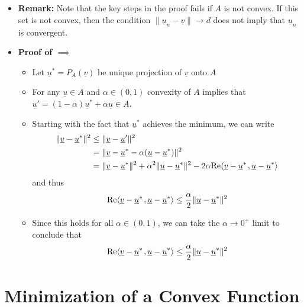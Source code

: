 \documentclass[11pt,twoside]{report}
\newcommand{\vecnot}{\underline}
\newcommand{\Real}{\mathrm{Re}}
\newcommand{\inner}[2]{{\left\langle #1 \mskip2mu , #2 \right\rangle}}
\begin{document}
\begin{itemize}
\begin{itemize}
\end{itemize}


\item \textbf{Remark:} Note that the key steps in the proof fails if $A$ is not convex. If this set is not convex, then  %
 the condition  $\| \vecnot{u}_n - \vecnot{v} \| \to d$ does not imply that $ \vecnot{u}_n$ is convergent. 


\item \textbf{Proof of $\implies$} 
\begin{itemize}
\item Let $\vecnot{u}^* = P_A (\vecnot{v}) $ be unique projection of $\vecnot{v}$ onto $A$
\item For any $\vecnot{u} \in A$ and $\alpha \in (0,1)$ convexity of $A$ implies that $\vecnot{u}' = (1-\alpha) \vecnot{u}^* + \alpha \vecnot{u} \in A$. 
\item Starting with the fact that $\vecnot{u}^*$ achieves the minimum, we can write
\begin{align*}
\| \vecnot{v} - \vecnot{u}^*\|^2 &  \le \| \vecnot{v} - \vecnot{u}'\|^2 \\
&  = \| \vecnot{v} - \vecnot{u}^*   - \alpha ( \vecnot{u} - \vecnot{u}^*) \|^2 \\
&  = \| \vecnot{v} - \vecnot{u}^*\|^2    + \alpha^2 \|\vecnot{u} - \vecnot{u}^*\|^2 -  2 \alpha \Real{\inner{ \vecnot{v} - \vecnot{u}^*}{ \vecnot{u} - \vecnot{u}^*}}
\end{align*}
and thus 
\[
\Real{\inner{ \vecnot{v} - \vecnot{u}^*}{ \vecnot{u} - \vecnot{u}^*}} \le \frac{ \alpha}{2} \|\vecnot{u} - \vecnot{u}^*\|^2
\] 
\item Since this holds for all $\alpha \in (0,1)$, we can take the  $\alpha \to 0^+$ limit to conclude that
\[
\Real{\inner{ \vecnot{v} - \vecnot{u}^*}{ \vecnot{u} - \vecnot{u}^*}} \le \frac{ \alpha}{2} \|\vecnot{u} - \vecnot{u}^*\|^2
\] 
\end{itemize}

\end{itemize}

\section{Minimization of a Convex Function} 
\end{document}
